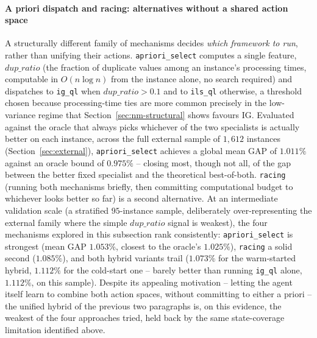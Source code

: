 \documentclass[final,3p,times,11pt,authoryear]{elsarticle}
\begin{document}
\paragraph{A priori dispatch and racing: alternatives without a shared
action space} A structurally different family of mechanisms decides
\emph{which framework to run}, rather than unifying their actions.
\texttt{apriori\_select} computes a single feature, $\mathit{dup\_ratio}$
(the fraction of duplicate values among an instance's processing times,
computable in $O(n\log n)$ from the instance alone, no search
required) and dispatches to \texttt{ig\_ql} when $\mathit{dup\_ratio} > 0.1$
and to \texttt{ils\_ql} otherwise, a threshold chosen because
processing-time ties are more common precisely in the low-variance
regime that Section~\ref{sec:nm-structural} shows favours IG. Evaluated
against the oracle that always picks whichever of the two specialists
is actually better on each instance, across the full external sample
of $1{,}612$ instances (Section~\ref{sec:external}), \texttt{apriori\_select}
achieves a global mean GAP of $1.011\%$ against an oracle bound of
$0.975\%$ -- closing most, though not all, of the gap between the
better fixed specialist and the theoretical best-of-both. \texttt{racing}
(running both mechanisms briefly, then committing computational budget
to whichever looks better so far) is a second alternative. At an
intermediate validation scale (a stratified $95$-instance sample,
deliberately over-representing the external family where the simple
$\mathit{dup\_ratio}$ signal is weakest), the four mechanisms explored
in this subsection rank consistently: \texttt{apriori\_select} is
strongest (mean GAP $1.053\%$, closest to the oracle's $1.025\%$),
\texttt{racing} a solid second ($1.085\%$), and both hybrid variants
trail ($1.073\%$ for the warm-started hybrid, $1.112\%$ for the
cold-start one -- barely better than running \texttt{ig\_ql} alone,
$1.112\%$, on this sample). Despite its appealing motivation --
letting the agent itself learn to combine both action spaces, without
committing to either a priori -- the unified hybrid of the previous
two paragraphs is, on this evidence, the weakest of the four
approaches tried, held back by the same state-coverage limitation
identified above.
\end{document}
